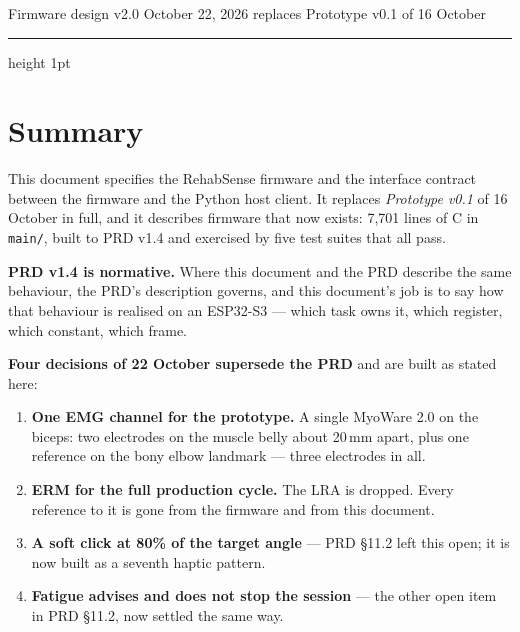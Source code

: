 \documentclass[11pt]{article}
\begin{document}
\begin{center}
{\LARGE\bfseries \DocTitle}\\[2pt]
{\large\color{soft} \DocSub}\\[10pt]
{\small \CourseLine}\\[2pt]
{\small \AuthorLine}\\[2pt]
{\small\color{soft} \InstructorLine}\\[2pt]
{\small\color{soft} Firmware design v2.0 \quad\textbullet\quad October 22, 2026 \quad\textbullet\quad
replaces Prototype v0.1 of 16 October}
\end{center}
\vspace{4pt}
{\color{rule}\hrule height 1pt}
\vspace{10pt}

\section{Summary}

This document specifies the RehabSense firmware and the interface contract
between the firmware and the Python host client. It replaces \emph{Prototype
v0.1} of 16 October in full, and it describes firmware that now exists:
7{,}701 lines of C in \texttt{main/}, built to PRD v1.4 and exercised by five
test suites that all pass.

\begin{callout}
\textbf{PRD v1.4 is normative.} Where this document and the PRD describe the
same behaviour, the PRD's description governs, and this document's job is to
say how that behaviour is realised on an ESP32-S3 --- which task owns it,
which register, which constant, which frame.

\medskip
\textbf{Four decisions of 22 October supersede the PRD} and are built as
stated here:

\smallskip
\begin{enumerate}
\item \textbf{One EMG channel for the prototype.} A single MyoWare 2.0 on the
biceps: two electrodes on the muscle belly about 20\,mm apart, plus one
reference on the bony elbow landmark --- three electrodes in all.
\item \textbf{ERM for the full production cycle.} The LRA is dropped. Every
reference to it is gone from the firmware and from this document.
\item \textbf{A soft click at 80\% of the target angle} --- PRD \S11.2 left
this open; it is now built as a seventh haptic pattern.
\item \textbf{Fatigue advises and does not stop the session} --- the other
open item in PRD \S11.2, now settled the same way.
\end{enumerate}
\end{callout}
\end{document}
